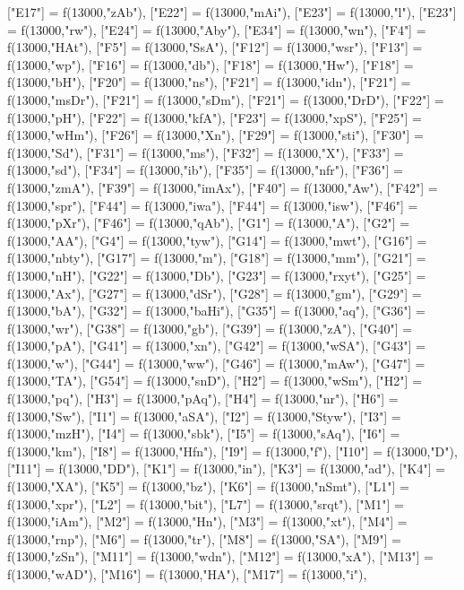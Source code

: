 \documentclass{article}
\begin{document}
\begin{luacode*}
{	["E17"] = f(13000,"zAb"),
	["E22"] = f(13000,"mAi"),
	["E23"] = f(13000,"l"),
	["E23"] = f(13000,"rw"),
	["E24"] = f(13000,"Aby"),
	["E34"] = f(13000,"wn"),
	["F4"] = f(13000,"HAt"),
	["F5"] = f(13000,"SsA"),
	["F12"] = f(13000,"wsr"),
	["F13"] = f(13000,"wp"),
	["F16"] = f(13000,"db"),
	["F18"] = f(13000,"Hw"),
	["F18"] = f(13000,"bH"),
	["F20"] = f(13000,"ns"),
	["F21"] = f(13000,"idn"),
	["F21"] = f(13000,"msDr"),
	["F21"] = f(13000,"sDm"),
	["F21"] = f(13000,"DrD"),
	["F22"] = f(13000,"pH"),
	["F22"] = f(13000,"kfA"),
	["F23"] = f(13000,"xpS"),
	["F25"] = f(13000,"wHm"),
	["F26"] = f(13000,"Xn"),
	["F29"] = f(13000,"sti"),
	["F30"] = f(13000,"Sd"),
	["F31"] = f(13000,"ms"),
	["F32"] = f(13000,"X"),
	["F33"] = f(13000,"sd"),
	["F34"] = f(13000,"ib"),
	["F35"] = f(13000,"nfr"),
	["F36"] = f(13000,"zmA"),
	["F39"] = f(13000,"imAx"),
	["F40"] = f(13000,"Aw"),
	["F42"] = f(13000,"spr"),
	["F44"] = f(13000,"iwa"),
	["F44"] = f(13000,"isw"),
	["F46"] = f(13000,"pXr"),
	["F46"] = f(13000,"qAb"),
	["G1"] = f(13000,"A"),
	["G2"] = f(13000,"AA"),
	["G4"] = f(13000,"tyw"),
	["G14"] = f(13000,"mwt"),
	["G16"] = f(13000,"nbty"),
	["G17"] = f(13000,"m"),
	["G18"] = f(13000,"mm"),
	["G21"] = f(13000,"nH"),
	["G22"] = f(13000,"Db"),
	["G23"] = f(13000,"rxyt"),
	["G25"] = f(13000,"Ax"),
	["G27"] = f(13000,"dSr"),	
	["G28"] = f(13000,"gm"),
	["G29"] = f(13000,"bA"),
	["G32"] = f(13000,"baHi"),
	["G35"] = f(13000,"aq"),
	["G36"] = f(13000,"wr"),
	["G38"] = f(13000,"gb"),
	["G39"] = f(13000,"zA"),
	["G40"] = f(13000,"pA"),
	["G41"] = f(13000,"xn"),
	["G42"] = f(13000,"wSA"),
	["G43"] = f(13000,"w"),
	["G44"] = f(13000,"ww"),
	["G46"] = f(13000,"mAw"),
	["G47"] = f(13000,"TA"),
	["G54"] = f(13000,"snD"),
	["H2"] = f(13000,"wSm"),
	["H2"] = f(13000,"pq"),
	["H3"] = f(13000,"pAq"),
	["H4"] = f(13000,"nr"),
	["H6"] = f(13000,"Sw"),
	["I1"] = f(13000,"aSA"),
	["I2"] = f(13000,"Styw"),
	["I3"] = f(13000,"mzH"),
	["I4"] = f(13000,"sbk"),
	["I5"] = f(13000,"sAq"),
	["I6"] = f(13000,"km"),
	["I8"] = f(13000,"Hfn"),
	["I9"] = f(13000,"f"),
	["I10"] = f(13000,"D"),
	["I11"] = f(13000,"DD"),
	["K1"] = f(13000,"in"),
	["K3"] = f(13000,"ad"),
	["K4"] = f(13000,"XA"),
	["K5"] = f(13000,"bz"),
	["K6"] = f(13000,"nSmt"),
	["L1"] = f(13000,"xpr"),
	["L2"] = f(13000,"bit"),
	["L7"] = f(13000,"srqt"),
	["M1"] = f(13000,"iAm"),
	["M2"] = f(13000,"Hn"),
	["M3"] = f(13000,"xt"),
	["M4"] = f(13000,"rnp"),
	["M6"] = f(13000,"tr"),
	["M8"] = f(13000,"SA"),
	["M9"] = f(13000,"zSn"),
	["M11"] = f(13000,"wdn"),
	["M12"] = f(13000,"xA"),
	["M13"] = f(13000,"wAD"),
	["M16"] = f(13000,"HA"),
	["M17"] = f(13000,"i"),
}
\end{luacode*}
\end{document}
